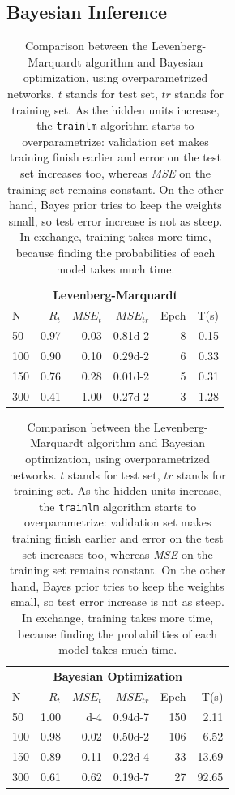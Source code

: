 \documentclass[a4paper, 10pt]{article}
\begin{document}
  \subsection{Bayesian Inference}
  \begin{table}[h]
    \centering
    \hfill
    \begin{tabular}{@{}lrrrrr@{}}
      \toprule
      \multicolumn{6}{c}{\textbf{Levenberg-Marquardt}} \\
    N  &   $R_{t}$  &  $MSE_{t}$ &  $MSE_{tr}$ & Epch  & T(s)\\
      \midrule
      50   &   0.97    &   0.03    &  \num{0.81d-2}  &  8   &  0.15  \\
      100  &   0.90    &   0.10    &  \num{0.29d-2}  &  6   &  0.33  \\
      150  &   0.76    &   0.28    &  \num{0.01d-2}  &  5   &  0.31  \\
      300  &   0.41    &   1.00    &  \num{0.27d-2}  &  3   &  1.28  \\
      \bottomrule
    \end{tabular} 
    \hfill
    \begin{tabular}{@{}lrrrrr@{}}
      \toprule
      \multicolumn{6}{c}{\textbf{Bayesian Optimization}} \\
      N  &   $R_{t}$  &  $MSE_{t}$ & $MSE_{tr}$  & Epch  & T(s)\\
      \midrule
      50   &   1.00    &   \num{d-4}  &  \num{0.94d-7}   & 150   &    2.11  \\
      100  &   0.98    &   0.02       &  \num{0.50d-2}   & 106   &    6.52  \\
      150  &   0.89    &   0.11       &  \num{0.22d-4}   &  33   &   13.69  \\
      300  &   0.61    &   0.62       &  \num{0.19d-7}   &  27   &   92.65  \\
      \bottomrule
    \end{tabular}  \hfill\mbox{}
    \caption{Comparison between the Levenberg-Marquardt algorithm and Bayesian
    optimization, using overparametrized networks. $t$ stands for test set, $tr$
    stands for training set. As the hidden units increase, the \texttt{trainlm} 
    algorithm starts to overparametrize: validation set makes training finish 
    earlier and error on the test set increases too, whereas \emph{MSE} on the 
    training set remains constant. On the other hand, Bayes prior tries to keep
    the weights small, so test error increase is not as steep. In exchange, training
    takes more time, because finding the probabilities of each model takes
    much time.}
    \label{tab:bayes}
    \end{table}
\end{document}
